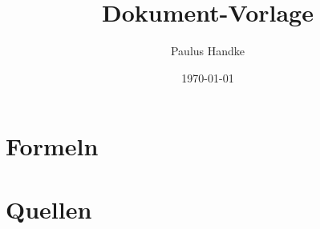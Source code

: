 \documentclass{article}
\title{Dokument-Vorlage}
\date{\today}
\author{Paulus Handke}
\begin{document}
\normalfont
{}
\maketitle
\newpage
\tableofcontents
{}
\newpage


\section{Formeln}

\section{Quellen}

\end{document}
